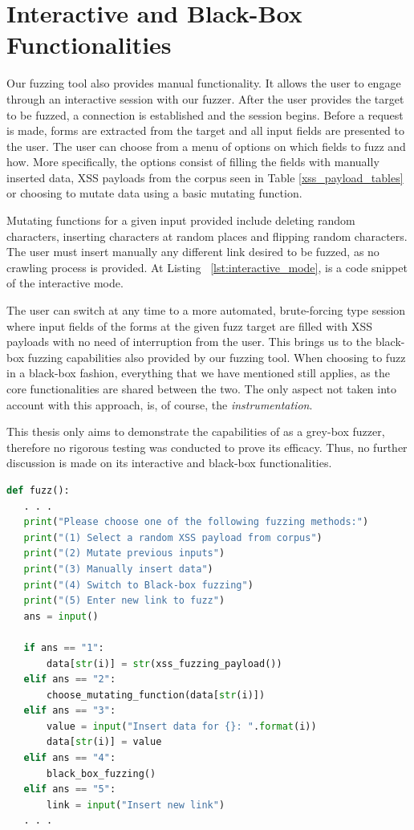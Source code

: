 \section{Interactive and Black-Box Functionalities}
Our fuzzing tool also provides manual functionality. It allows the user to engage through an interactive session with our fuzzer. After the user provides the target to be fuzzed, a connection is established and the session begins. Before a request is made, forms are extracted from the target and all input fields are presented to the user. The user can choose from a menu of options on which fields to fuzz and how. More specifically, the options consist of filling the fields with manually inserted data, XSS payloads from the corpus seen in Table \ref{xss_payload_tables} or choosing to mutate data using a basic mutating function. 

Mutating functions for a given input provided include deleting random characters, inserting characters at random places and flipping random characters. The user must insert manually any different link desired to be fuzzed, as no crawling process is provided. At Listing ~\ref{lst:interactive_mode}, is a code snippet of the interactive mode. 

The user can switch at any time to a more automated, brute-forcing type session where input fields of the forms at the given fuzz target are filled with XSS payloads with no need of interruption from the user. This brings us to the black-box fuzzing capabilities also provided by our fuzzing tool. When choosing to fuzz in a black-box fashion, everything that we have mentioned still applies, as the core functionalities are shared between the two. The only aspect not taken into account with this approach, is, of course, the \emph{instrumentation}.

This thesis only aims to demonstrate the capabilities of \pname{} as a grey-box fuzzer, therefore no rigorous testing was conducted to prove its efficacy. Thus, no further discussion is made on its interactive and black-box functionalities.

\begin{lstlisting}[aboveskip=\baselineskip, showstringspaces=false, frame=single, language=Python, columns=flexible, keepspaces=true, caption={\textit{Options menu and their processing during interactive mode fuzzing}}, numberstyle=\color{gray}, numbersep=5pt, label={lst:interactive_mode}]
def fuzz():
   . . .
   print("Please choose one of the following fuzzing methods:")
   print("(1) Select a random XSS payload from corpus")
   print("(2) Mutate previous inputs")
   print("(3) Manually insert data")
   print("(4) Switch to Black-box fuzzing")
   print("(5) Enter new link to fuzz")
   ans = input()
   
   if ans == "1":
       data[str(i)] = str(xss_fuzzing_payload())
   elif ans == "2":
       choose_mutating_function(data[str(i)])
   elif ans == "3":
       value = input("Insert data for {}: ".format(i))
       data[str(i)] = value
   elif ans == "4":
       black_box_fuzzing()
   elif ans == "5":
       link = input("Insert new link")
   . . .
     
\end{lstlisting}

